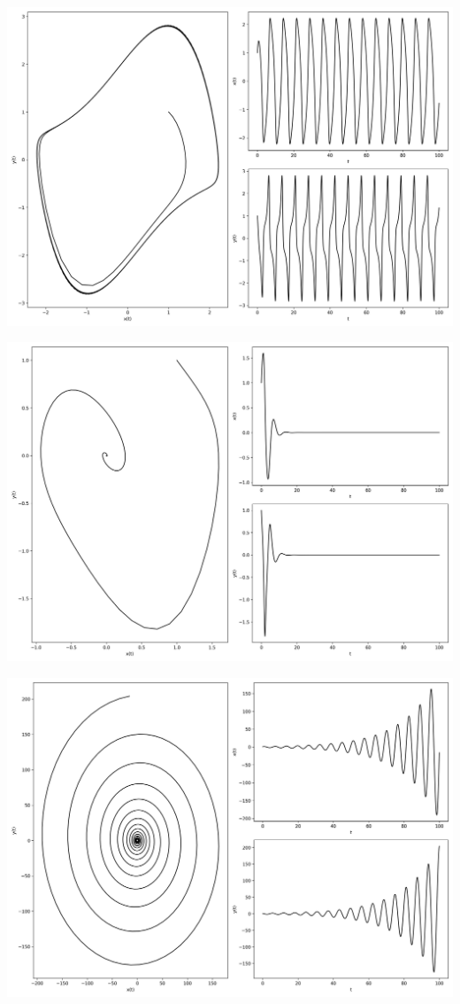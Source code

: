 \documentclass[12pt,a4paper]{jsarticle}
\makeatletter
\def\figcaption{\def\@captype{figure}\caption}
\makeatother
\begin{document}
\includegraphics[scale=0.33]{x1,0y1,0mu1,0omega1,0t1,00e+02n1,00e+03.png}
\figcaption{$x_0=1,00, y_0=1.00, \mu=1.00, \omega=1.00, T = 100, N = 1000$}
\includegraphics[scale=0.33]{x1,0y1,0mu-1,0omega1,0t1,00e+02n1,00e+03.png}
\figcaption{$x_0=1,00, y_0=1.00, \mu=-1.00, \omega=1.00, T = 100, N = 1000$}
\includegraphics[scale=0.33]{x1,0y1,0mu0,0omega1,0t1,00e+02n1,00e+03.png}
\end{document}
